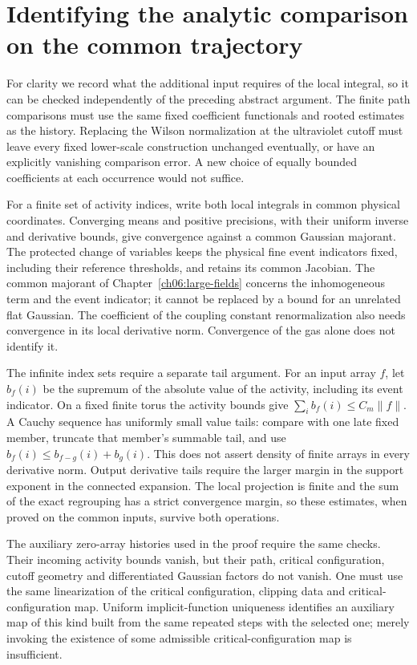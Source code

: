 \section{Identifying the analytic comparison on the common trajectory}
\label{ch10:identification}

For clarity we record what the additional input requires of the local
integral, so it can be checked independently of the preceding abstract
argument. The finite path comparisons must use the same fixed
coefficient functionals and rooted estimates as the history. Replacing the
Wilson normalization at the ultraviolet cutoff must leave every fixed lower-scale
construction unchanged eventually, or have an explicitly vanishing
comparison error. A new choice of equally bounded coefficients at
each occurrence would not suffice.

For a finite set of activity indices, write both local integrals in
common physical coordinates. Converging means and positive precisions,
with their uniform inverse and derivative bounds, give convergence
against a common Gaussian majorant. The protected change of variables keeps the physical fine event indicators fixed,
including their reference thresholds, and retains its common Jacobian. The common majorant of
Chapter~\ref{ch06:large-fields} concerns the inhomogeneous term and the event indicator;
it cannot be replaced by a bound for an unrelated flat Gaussian.
The coefficient of the coupling constant renormalization also needs convergence in its local
derivative norm. Convergence of the gas alone does not identify it.

The infinite index sets require a separate tail argument. For an
input array $f$, let $b_f(i)$ be the supremum of the absolute value of the
activity, including its event indicator. On a fixed finite torus the activity bounds
give $\sum_i b_f(i)\le C_m\|f\|$. A Cauchy sequence has uniformly
small value tails: compare with one late fixed member, truncate that
member's summable tail, and use
$b_f(i)\le b_{f-g}(i)+b_g(i)$. This does not assert density of finite
arrays in every derivative norm. Output derivative tails require the
larger margin in the support exponent in the connected expansion. The local
projection is finite and the sum of the exact regrouping has a strict convergence
margin, so these estimates, when proved on the common inputs, survive
both operations.

The auxiliary zero-array histories used in the proof require the same
checks. Their incoming activity bounds vanish, but their path,
critical configuration, cutoff geometry and differentiated Gaussian factors
do not vanish. One must use the same linearization of the critical configuration, clipping data and
critical-configuration map. Uniform implicit-function uniqueness identifies an
auxiliary map of this kind built from the same repeated steps with the selected one; merely invoking the
existence of some admissible critical-configuration map is insufficient.

